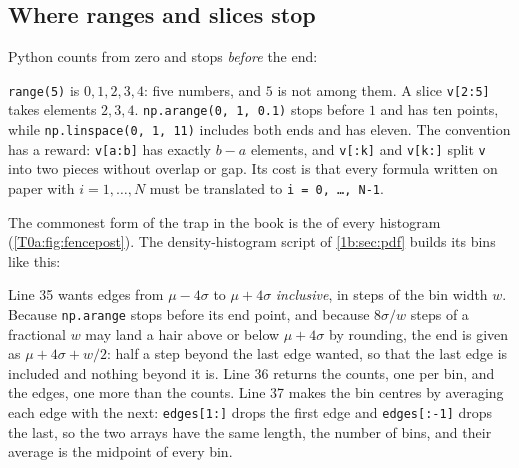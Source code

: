 \subsection{Where ranges and slices stop}
\label{T0a:sec:pit-range}

Python counts from zero and stops \emph{before} the end:


\texttt{range(5)} is $0,1,2,3,4$: five numbers, and $5$ is not among them. A slice \texttt{v[2:5]} takes elements $2,3,4$. \texttt{np.arange(0, 1, 0.1)} stops before $1$ and has ten points, while \texttt{np.linspace(0, 1, 11)} includes both ends and has eleven. The convention has a reward: \texttt{v[a:b]} has exactly $b-a$ elements, and \texttt{v[:k]} and \texttt{v[k:]} split \texttt{v} into two pieces without overlap or gap. Its cost is that every formula written on paper with $i=1,\dots,N$ must be translated to \texttt{i = 0, \dots, N-1}.

The commonest form of the trap in the book is the   of every histogram (\cref{T0a:fig:fencepost}). The density-histogram script of \cref{1b:sec:pdf} builds its bins like this:


Line 35 wants edges from $\mu-4\sigma$ to $\mu+4\sigma$ \emph{inclusive}, in steps of the bin width $w$. Because \texttt{np.arange} stops before its end point, and because $8\sigma/w$ steps of a fractional $w$ may land a hair above or below $\mu+4\sigma$ by rounding, the end is given as $\mu+4\sigma+w/2$: half a step beyond the last edge wanted, so that the last edge is included and nothing beyond it is. Line 36 returns the counts, one per bin, and the edges, one more than the counts. Line 37 makes the bin centres by averaging each edge with the next: \texttt{edges[1:]} drops the first edge and \texttt{edges[:-1]} drops the last, so the two arrays have the same length, the number of bins, and their average is the midpoint of every bin.

